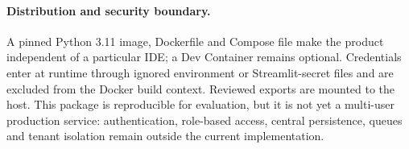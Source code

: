 \paragraph{Distribution and security boundary.}
A pinned Python 3.11 image, Dockerfile and Compose file make the product
independent of a particular IDE; a Dev Container remains optional. Credentials
enter at runtime through ignored environment or Streamlit-secret files and are
excluded from the Docker build context. Reviewed exports are mounted to the host.
This package is reproducible for evaluation, but it is not yet a multi-user
production service: authentication, role-based access, central persistence,
queues and tenant isolation remain outside the current implementation.
